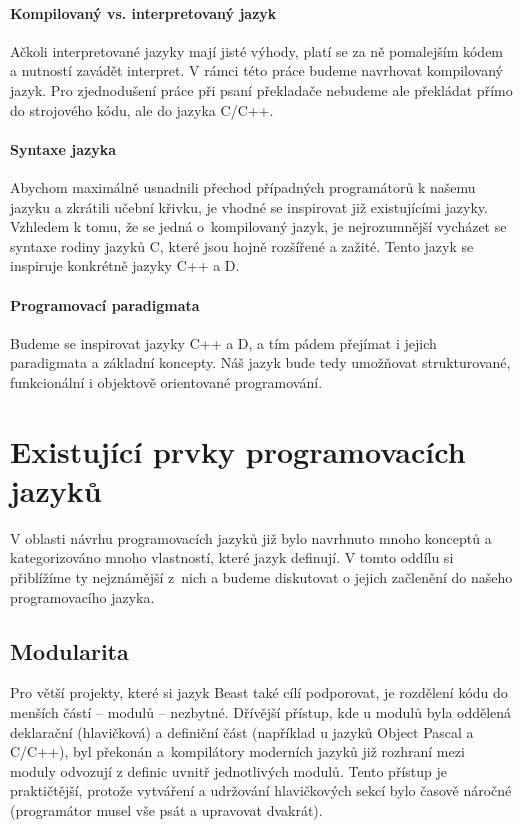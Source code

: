 \paragraph{Kompilovaný vs. interpretovaný jazyk}
Ačkoli interpretované jazyky mají jisté výhody, platí se za ně pomalejším kódem a nutností zavádět interpret. V rámci této práce budeme navrhovat kompilovaný jazyk. Pro zjednodušení práce při psaní překladače nebudeme ale překládat přímo do strojového kódu, ale do jazyka C/C++.

\paragraph{Syntaxe jazyka}
Abychom maximálně usnadnili přechod případných programátorů k našemu jazyku a zkrátili učební křivku, je vhodné se inspirovat již existujícími jazyky. Vzhledem k tomu, že se jedná o~kompilovaný jazyk, je nejrozumnější vycházet se syntaxe rodiny jazyků C, které jsou hojně rozšířené a zažité. Tento jazyk se inspiruje konkrétně jazyky C++ a D.

\paragraph{Programovací paradigmata}
Budeme se inspirovat jazyky C++ a D, a tím pádem přejímat i jejich paradigmata a základní koncepty. Náš jazyk bude tedy umožňovat strukturované, funkcionální i objektově orientované programování.

\section{Existující prvky programovacích jazyků}
V oblasti návrhu programovacích jazyků již bylo navrhnuto mnoho konceptů a kategorizováno mnoho vlastností, které jazyk definují. V tomto oddílu si přiblížíme ty nejznámější z~nich a budeme diskutovat o jejich začlenění do našeho programovacího jazyka.

\subsection{Modularita}
Pro větší projekty, které si jazyk Beast také cílí podporovat, je rozdělení kódu do menších částí -- modulů -- nezbytné. Dřívější přístup, kde u modulů byla oddělená deklarační (hlavičková) a definiční část (například u jazyků Object Pascal a C/C++), byl překonán a~kompilátory moderních jazyků již rozhraní mezi moduly odvozují z definic uvnitř jednotlivých modulů. Tento přístup je praktičtější, protože vytváření a udržování hlavičkových sekcí bylo časově náročné (programátor musel vše psát a upravovat dvakrát).

